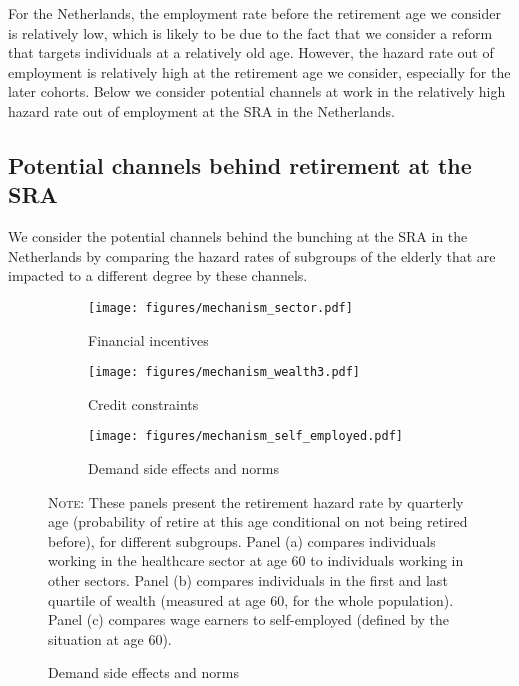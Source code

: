 \documentclass[12pt,a4paper]{article}
\begin{document}
For the Netherlands, the employment rate before the retirement age we consider is relatively low, which is likely to be due to the fact that we consider a reform that targets individuals at a relatively old age. However, the hazard rate out of employment is relatively high at the retirement age we consider, especially for the later cohorts. Below we consider potential channels at work in the relatively high hazard rate out of employment at the SRA in the Netherlands. 

\subsection{Potential channels behind retirement at the SRA}

We consider the potential channels behind the bunching at the SRA in the Netherlands by comparing the hazard rates of subgroups of the elderly that are impacted to a different degree by these channels.

\begin{figure}[p]
	
	\begin{adjustwidth}{-1.1in}{-1in}
		
	\caption{Determinants of bunching at the SRA}
	\label{channels}
	\centering
	\begin{subfigure}{0.65\textwidth}
		\centering
		\caption{Financial incentives}
		\texttt{[image: figures/mechanism\_sector.pdf]} %
		\label{channel_sector}
		\vspace*{0.3cm}
	\end{subfigure}
	\begin{subfigure}{0.65\textwidth}
		\centering
		\caption{Credit constraints}
		\texttt{[image: figures/mechanism\_wealth3.pdf]} 	
		\label{channel_credit}
	\vspace*{0.3cm}
	\end{subfigure}
	\begin{subfigure}{0.65\textwidth}
	\centering
	\caption{Demand side effects and norms}
	\texttt{[image: figures/mechanism\_self\_employed.pdf]}
	\label{channel_norm}
\end{subfigure}
	\begin{minipage}{15cm}%
		\footnotesize
		\small \textsc{Note:} These panels present the retirement hazard rate by quarterly age (probability of retire at this age conditional on not being retired before), for different subgroups. Panel (a) compares individuals working in the healthcare sector at age 60 to individuals working in other sectors. Panel (b) compares individuals in the first and last quartile of wealth (measured at age 60, for the whole population). Panel (c) compares wage earners to self-employed (defined by the situation at age 60).
	\end{minipage}%

\end{adjustwidth}

\end{figure}
\end{document}
